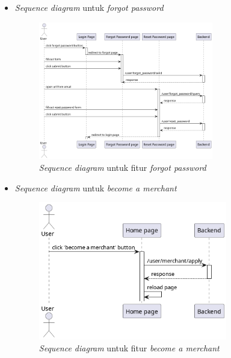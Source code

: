 \documentclass[a4paper]{article}
\begin{document}
\begin{enumerate}
\begin{enumerate}
\begin{itemize}
            \newpage
            \item \textit{Sequence diagram} untuk \textit{forgot password}
            \begin{figure}[h]
                \centering
                \includegraphics*[height=6cm]{diagram/sequence diagram/FE/7. forgot password/forgot password.png}
                \caption{\textit{Sequence diagram} untuk fitur \textit{forgot password}}
            \end{figure}

            \item \textit{Sequence diagram} untuk \textit{become a merchant}
            \begin{figure}[h]
                \centering
                \includegraphics*[height=6cm]{diagram/sequence diagram/FE/8. become a merchant/become a merchant.png}
                \caption{\textit{Sequence diagram} untuk fitur \textit{become a merchant}}
            \end{figure}


\end{itemize}
\end{enumerate}
\end{enumerate}
\end{document}
